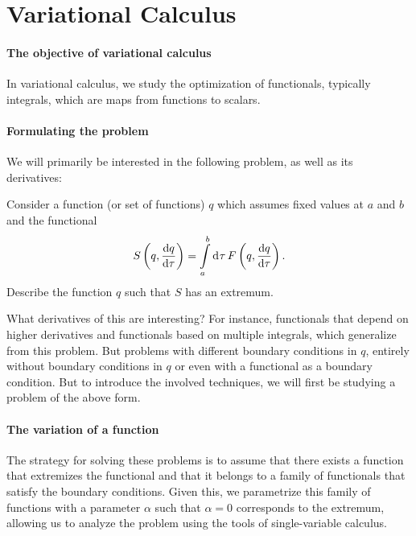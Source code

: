 \section{Variational Calculus}

\paragraph{The objective of variational calculus}
In variational calculus, we study the optimization of functionals, typically integrals, which are maps from functions to scalars.

\paragraph{Formulating the problem}
We will primarily be interested in the following problem, as well as its derivatives:

Consider a function (or set of functions) $q$ which assumes fixed values at $a$ and $b$ and the functional
\begin{align*}
	S\left(q, \dv{q}{\tau}\right) = \int\limits_{a}^{b}\dd[]{\tau}F\left(q, \dv{q}{\tau}\right).
\end{align*}
Describe the function $q$ such that $S$ has an extremum.

What derivatives of this are interesting? For instance, functionals that depend on higher derivatives and functionals based on multiple integrals, which generalize from this problem. But problems with different boundary conditions in $q$, entirely without boundary conditions in $q$ or even with a functional as a boundary condition. But to introduce the involved techniques, we will first be studying a problem of the above form.

\paragraph{The variation of a function}
The strategy for solving these problems is to assume that there exists a function that extremizes the functional and that it belongs to a family of functionals that satisfy the boundary conditions. Given this, we parametrize this family of functions with a parameter $\alpha$ such that $\alpha = 0$ corresponds to the extremum\footnotemark, allowing us to analyze the problem using the tools of single-variable calculus.


